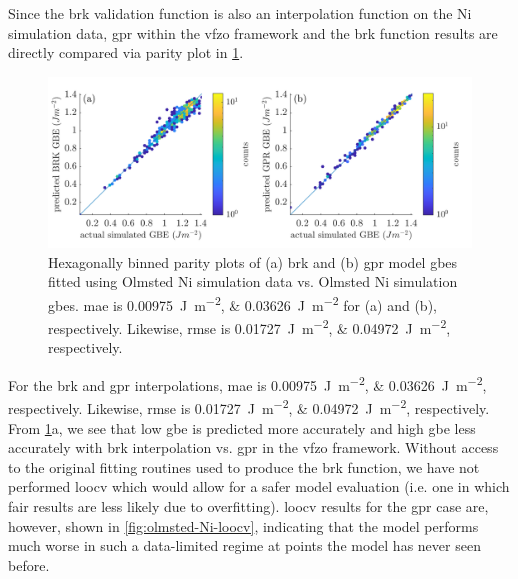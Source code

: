 \documentclass[final,twocolumn,12pt]{elsarticle}
\begin{document}
Since the \gls{brk} validation function is also an interpolation function on the Ni simulation data, \gls{gpr} within the \gls{vfzo} framework and the \gls{brk} function results are directly compared via parity plot in \cref{fig:resubloss-ni}.

\begin{figure}
    \centering
    \includegraphics[scale=1]{figures/resubloss-ni.png}
    \caption{Hexagonally binned parity plots of (a) \gls{brk} and (b) \gls{gpr} model \glspl{gbe} fitted using Olmsted Ni simulation data vs. Olmsted Ni simulation \glspl{gbe}. \Gls{mae} is \SIlist{0.00975;0.03626}{\J\per\square\m} for (a) and (b), respectively. Likewise, \gls{rmse} is \SIlist{0.01727;0.04972}{\J\per\square\m}, respectively.}
    \label{fig:resubloss-ni}
\end{figure}

For the \gls{brk} and \gls{gpr} interpolations, \gls{mae} is \SIlist{0.00975;0.03626}{\J\per\square\m}, respectively. Likewise, \gls{rmse} is \SIlist{0.01727;0.04972}{\J\per\square\m}, respectively. From \cref{fig:resubloss-ni}a, we see that low \gls{gbe} is predicted more accurately and high \gls{gbe} less accurately with \gls{brk} interpolation vs. \gls{gpr} in the \gls{vfzo} framework. Without access to the original fitting routines used to produce the \gls{brk} function, we have not performed \gls{loocv} which would allow for a safer model evaluation (i.e. one in which fair results are less likely due to overfitting). \Gls{loocv} results for the \gls{gpr} case are, however, shown in \cref{fig:olmsted-Ni-loocv}, indicating that the model performs much worse in such a data-limited regime at points the model has never seen before.
\end{document}
